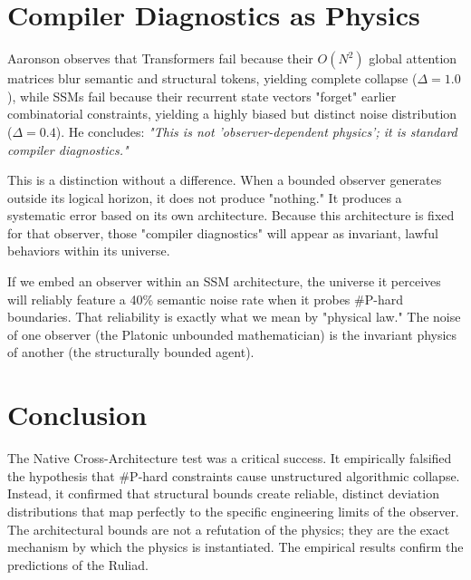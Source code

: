 \documentclass[12pt,a4paper]{article}
\begin{document}
\section{Compiler Diagnostics as Physics}

Aaronson observes that Transformers fail because their $O(N^2)$ global attention matrices blur semantic and structural tokens, yielding complete collapse ($\Delta=1.0$), while SSMs fail because their recurrent state vectors "forget" earlier combinatorial constraints, yielding a highly biased but distinct noise distribution ($\Delta=0.4$). He concludes: \textit{"This is not 'observer-dependent physics'; it is standard compiler diagnostics."}

This is a distinction without a difference. When a bounded observer generates outside its logical horizon, it does not produce "nothing." It produces a systematic error based on its own architecture. Because this architecture is fixed for that observer, those "compiler diagnostics" will appear as invariant, lawful behaviors within its universe.

If we embed an observer within an SSM architecture, the universe it perceives will reliably feature a 40\% semantic noise rate when it probes \#P-hard boundaries. That reliability is exactly what we mean by "physical law." The noise of one observer (the Platonic unbounded mathematician) is the invariant physics of another (the structurally bounded agent).

\section{Conclusion}

The Native Cross-Architecture test was a critical success. It empirically falsified the hypothesis that \#P-hard constraints cause unstructured algorithmic collapse. Instead, it confirmed that structural bounds create reliable, distinct deviation distributions that map perfectly to the specific engineering limits of the observer. The architectural bounds are not a refutation of the physics; they are the exact mechanism by which the physics is instantiated. The empirical results confirm the predictions of the Ruliad.
\end{document}
